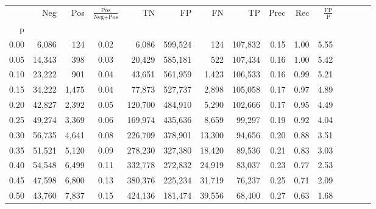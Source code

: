 \begin{tabular}{rrrcrrrrrrrrrrr}
\toprule
{} &     Neg &    Pos & $\frac{\text{Pos}}{\text{Neg}+\text{Pos}}$ &       TN &       FP &       FN &       TP &  Prec &   Rec & $\frac{\text{FP}}{\text{P}}$ \\
p    &         &        &                                            &          &          &          &          &       &       &                              \\
\midrule
0.00 &   6,086 &    124 &                                       0.02 &    6,086 &  599,524 &      124 &  107,832 &  0.15 &  1.00 &                         5.55 \\
0.05 &  14,343 &    398 &                                       0.03 &   20,429 &  585,181 &      522 &  107,434 &  0.16 &  1.00 &                         5.42 \\
0.10 &  23,222 &    901 &                                       0.04 &   43,651 &  561,959 &    1,423 &  106,533 &  0.16 &  0.99 &                         5.21 \\
0.15 &  34,222 &  1,475 &                                       0.04 &   77,873 &  527,737 &    2,898 &  105,058 &  0.17 &  0.97 &                         4.89 \\
0.20 &  42,827 &  2,392 &                                       0.05 &  120,700 &  484,910 &    5,290 &  102,666 &  0.17 &  0.95 &                         4.49 \\
0.25 &  49,274 &  3,369 &                                       0.06 &  169,974 &  435,636 &    8,659 &   99,297 &  0.19 &  0.92 &                         4.04 \\
0.30 &  56,735 &  4,641 &                                       0.08 &  226,709 &  378,901 &   13,300 &   94,656 &  0.20 &  0.88 &                         3.51 \\
0.35 &  51,521 &  5,120 &                                       0.09 &  278,230 &  327,380 &   18,420 &   89,536 &  0.21 &  0.83 &                         3.03 \\
0.40 &  54,548 &  6,499 &                                       0.11 &  332,778 &  272,832 &   24,919 &   83,037 &  0.23 &  0.77 &                         2.53 \\
0.45 &  47,598 &  6,800 &                                       0.13 &  380,376 &  225,234 &   31,719 &   76,237 &  0.25 &  0.71 &                         2.09 \\
0.50 &  43,760 &  7,837 &                                       0.15 &  424,136 &  181,474 &   39,556 &   68,400 &  0.27 &  0.63 &                         1.68 \\

\end{tabular}
